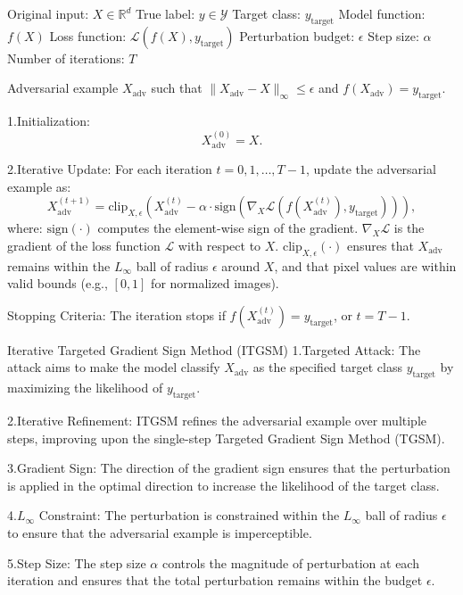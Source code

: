 
Original input: $X \in \mathbb{R}^d$
True label: $y \in \mathcal{Y}$
Target class: $y_{\text{target}}$
Model function: $f(X)$
Loss function: $\mathcal{L}(f(X), y_{\text{target}})$
Perturbation budget: $\epsilon$
Step size: $\alpha$
Number of iterations: $T$

Adversarial example $X_{\text{adv}}$ such that $\|X_{\text{adv}} - X\|_\infty \leq \epsilon$ and $f(X_{\text{adv}}) = y_{\text{target}}$.

1.Initialization:
   \[
   X^{(0)}_{\text{adv}} = X.
   \]

2.Iterative Update:
   For each iteration $t = 0, 1, \dots, T-1$, update the adversarial example as:
   \[
   X^{(t+1)}_{\text{adv}} = \text{clip}_{X, \epsilon} \left( X^{(t)}_{\text{adv}} - \alpha \cdot \text{sign} \left( \nabla_X \mathcal{L}(f(X^{(t)}_{\text{adv}}), y_{\text{target}}) \right) \right),
   \]
where:
$\text{sign}(\cdot)$ computes the element-wise sign of the gradient.
$\nabla_X \mathcal{L}$ is the gradient of the loss function $\mathcal{L}$ with respect to $X$.
$\text{clip}_{X, \epsilon}(\cdot)$ ensures that $X_{\text{adv}}$ remains within the $L_\infty$ ball of radius $\epsilon$ around $X$, and that pixel values are within valid bounds (e.g., $[0, 1]$ for normalized images).

Stopping Criteria: The iteration stops if $f(X^{(t)}_{\text{adv}}) = y_{\text{target}}$, or $t = T-1$.

Iterative Targeted Gradient Sign Method (ITGSM)
1.Targeted Attack: The attack aims to make the model classify $X_{\text{adv}}$ as the specified target class $y_{\text{target}}$ by maximizing the likelihood of $y_{\text{target}}$.

2.Iterative Refinement: ITGSM refines the adversarial example over multiple steps, improving upon the single-step Targeted Gradient Sign Method (TGSM).

3.Gradient Sign: The direction of the gradient sign ensures that the perturbation is applied in the optimal direction to increase the likelihood of the target class.

4.$L_\infty$ Constraint: The perturbation is constrained within the $L_\infty$ ball of radius $\epsilon$ to ensure that the adversarial example is imperceptible.

5.Step Size: The step size $\alpha$ controls the magnitude of perturbation at each iteration and ensures that the total perturbation remains within the budget $\epsilon$.